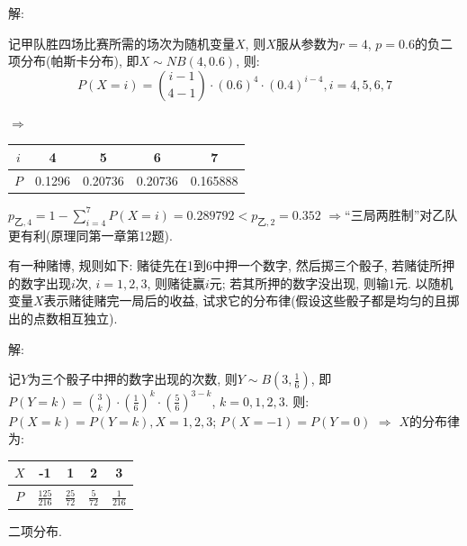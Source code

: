 \documentclass[standard]{ExBook}
\renewenvironment{shaded}{%
  \def\FrameCommand{\fboxsep=\FrameSep \colorbox{shadecolor}}%
  \MakeFramed{\advance\hsize-\width \FrameRestore}%
}{%
  \endMakeFramed
}
\begin{document}
\begin{qitems}
\vspace{\dimexpr2.5cm-5em\relax}

解: 

记甲队胜四场比赛所需的场次为随机变量$X$, 则$X$服从参数为$r=4$, $p=0.6$的负二项分布(帕斯卡分布), 即$X\sim NB(4,0.6)$, 则:
$$P(X=i)=\binom{i-1}{4-1}\cdot(0.6)^{4}\cdot(0.4)^{i-4},i=4,5,6,7$$
\begin{center}
    $\Longrightarrow$
\setlength{\tabcolsep}{20pt}
\begin{tabular}{c|c|c|c|c}
    \hline
    $i$ & 4 & 5 & 6 & 7 \\
    \hline
    $P$ & 0.1296 & 0.20736 & 0.20736 & 0.165888\\
    \hline
\end{tabular}
\end{center}
$p_{\text{乙},4}=1-\sum\limits_{i=4}^{7}P(X=i)=0.289792 < p_{\text{乙},2}=0.352$ $\Longrightarrow$``三局两胜制''对乙队更有利(原理同第一章第12题).

\vspace{2.5cm-5em}

    \begin{bbox}
    \begin{shaded}
        \qitem
有一种赌博, 规则如下: 赌徒先在1到6中押一个数字, 然后掷三个骰子, 若赌徒所押的数字出现$i$次, $i=1,2,3$, 则赌徒赢$i$元; 若其所押的数字没出现, 则输1元. 以随机变量$X$表示赌徒赌完一局后的收益, 试求它的分布律(假设这些骰子都是均匀的且掷出的点数相互独立).
    \end{shaded}
    \end{bbox}

\vspace{\dimexpr2.5cm-5em\relax}

解: 

记$Y$为三个骰子中押的数字出现的次数, 则$Y\sim B(3,\displaystyle\frac{1}{6})$, 即$P(Y=k)=\binom{3}{k}\cdot(\displaystyle\frac{1}{6})^{k}\cdot(\frac{5}{6})^{3-k}$, $k=0,1,2,3$. 则: $P(X=k)=P(Y=k),X=1,2,3$; $P(X=-1)=P(Y=0)$ $\Longrightarrow$ $X$的分布律为:
\begin{center}
\renewcommand{\arraystretch}{1.5}
\setlength{\tabcolsep}{20pt}
\begin{tabular}{c|c|c|c|c}
    \hline
    $X$ & -1 & 1 & 2 & 3 \\
    \hline
    $P$ & $\displaystyle\frac{125}{216}$ & $\displaystyle\frac{25}{72}$ & $\displaystyle\frac{5}{72}$ & $\displaystyle\frac{1}{216}$ \\
    \hline
\end{tabular}
\end{center}
\textcolor{themeColor}{\selectfont {} 二项分布.}


\end{qitems}
\end{document}
